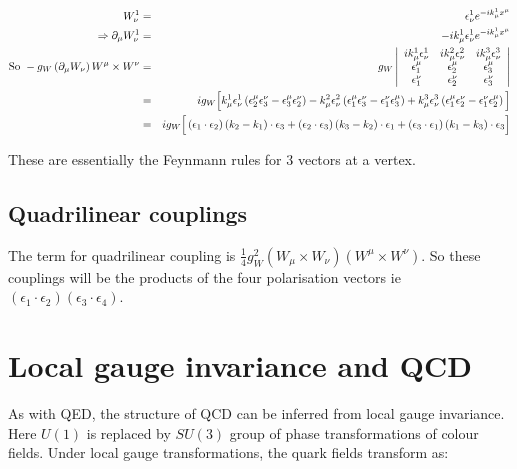 \begin{eqnarray*}
  W^1_{\nu} & = & \epsilon^1_{\nu}e^{-ik^1_{\mu}x^{\mu}} \\
  \Rightarrow \partial_{\mu}W^1_{\nu} & = & -ik^1_{\mu}\epsilon^1_{\nu}e^{-ik^1_{\mu}x^{\mu}} \\
  \textrm{So } -g_W\left(\partial_{\mu}W_{\nu}\right)W^{\mu}\times W^{\nu} & = & g_W
  \left|
  \begin{array}{ccc}
    ik^1_{\mu}\epsilon^1_{\nu} & ik^2_{\mu}\epsilon^2_{\nu} & ik^3_{\mu}\epsilon^3_{\nu} \\
    \epsilon_1^{\mu} & \epsilon_2^{\mu} & \epsilon_3^{\mu} \\
    \epsilon_1^{\nu} & \epsilon_2^{\nu} & \epsilon_3^{\nu}
  \end{array}
  \right|
  \\
  & = & ig_W \Big[ k^1_{\mu}\epsilon^1_{\nu}\left(\epsilon_2^{\mu}\epsilon_3^{\nu} - \epsilon_3^{\mu}\epsilon_2^{\nu}\right) - k^2_{\mu}\epsilon^2_{\nu}\left(\epsilon_1^{\mu}\epsilon_3^{\nu} - \epsilon_1^{\nu}\epsilon_3^{\mu}\right) + k^3_{\mu}\epsilon^3_{\nu}\left(\epsilon_1^{\mu}\epsilon_2^{\nu} - \epsilon_1^{\nu}\epsilon_2^{\mu}\right)\Big] \\
  & = & ig_W\Big[\left(\epsilon_1 \cdot \epsilon_2\right)\left(k_2 - k_1\right)\cdot \epsilon_3 + \left(\epsilon_2 \cdot \epsilon_3\right)\left(k_3 - k_2\right)\cdot \epsilon_1 + \left(\epsilon_3 \cdot \epsilon_1\right)\left(k_1 - k_3\right)\cdot \epsilon_3\Big]
\end{eqnarray*}

These are essentially the Feynmann rules for $3$ vectors at a vertex.

\subsection{Quadrilinear couplings}

The term for quadrilinear coupling is $\frac{1}{4}g_W^2\left(W_{\mu}\times W_{\nu}\right)\left(W^{\mu}\times W^{\nu}\right)$.  So these couplings will be the products of the four polarisation vectors ie $\left(\epsilon_1 \cdot \epsilon_2\right)\left(\epsilon_3 \cdot \epsilon_4\right)$.

\section{Local gauge invariance and QCD}

As with QED, the structure of QCD can be inferred from local gauge invariance.  Here $U(1)$ is replaced by $SU(3)$ group of phase transformations of colour fields.  Under local gauge transformations, the quark fields transform as:

